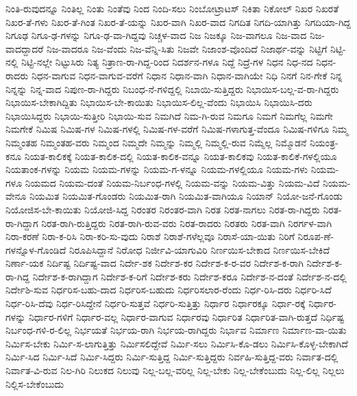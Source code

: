 {ನಿಂತಿ-ರುವುದನ್ನೂ
ನಿಂತಿಲ್ಲ
ನಿಂತು
ನಿಂತೆವು
ನಿಂದ
ನಿಂದಿ-ಸಲು
ನಿಂಬೋಟ್ರಾಟಸ್
ನಿಕಿತಾ
ನಿಕೋಲ್
ನಿಖರ
ನಿಖರತೆ
ನಿಖರ-ತೆ-ಗಳು
ನಿಖರ-ತೆ-ಗಿಂತ
ನಿಖರ-ತೆ-ಯನ್ನು
ನಿಖರ-ವಾಗಿ
ನಿಖರ-ವಾದ
ನಿಗದಿತ
ನಿಗದಿ-ಯಾಗಿತ್ತು
ನಿಗದಿಯಾ-ಗಿದ್ದ
ನಿಗೂಢ
ನಿಗೂ-ಢ-ಗಳನ್ನು
ನಿಗೂ-ಢ-ವಾ-ಗಿದ್ದವು
ನಿಚ್ಚಳ-ವಾದ
ನಿಜ
ನಿಜಕ್ಕೂ
ನಿಜ-ವಾಗಲೂ
ನಿಜ-ವಾದ
ನಿಜ-ವಾದದ್ದಾದರೆ
ನಿಜ-ವಾದರೂ
ನಿಜ-ವೆಂದು
ನಿಜ-ವೆನ್ನಿ-ಸಿತು
ನಿಜವೇ
ನಿಜಾಂಶ-ವೊಂದಿದೆ
ನಿಜಾರ್ಥ-ವನ್ನು
ನಿಟ್ಟಿಗೆ
ನಿಟ್ಟಿ-ನಲ್ಲಿ
ನಿಟ್ಟಿ-ನಲ್ಲೇ
ನಿಟ್ಟುಸಿರು
ನಿತ್ಯ
ನಿತ್ರಾಣ-ರಾ-ಗಿದ್ದ-ರಿಂದ
ನಿದರ್ಶನ-ಗಳೂ
ನಿದ್ದೆ
ನಿದ್ರೆ-ಗಳ
ನಿಧನ
ನಿಧ-ನದ
ನಿಧನ-ರಾದರು
ನಿಧನ-ವಾಗುವ
ನಿಧನ-ವಾಗುವ-ವರೆಗೆ
ನಿಧಾನ
ನಿಧಾನ-ವಾಗಿ
ನಿಧಾನ-ವಾಗಿಯೇ
ನಿಧಿ
ನಿನಗೆ
ನಿನ-ಗೇಕೆ
ನಿನ್ನ
ನಿನ್ನನ್ನು
ನಿನ್ನ-ವಾದ
ನಿಪುಣ-ರಾ-ಗಿದ್ದರು
ನಿಬಂಧ-ನೆ-ಗಳಿದ್ದಲ್ಲಿ
ನಿಬಾಯಿ-ಸುತ್ತಿದ್ದರು
ನಿಭಾಯಿಸ-ಬಲ್ಲ-ವ-ರಾ-ಗಿದ್ದರು
ನಿಭಾಯಿಸ-ಬೇಕಾಗಿದ್ದಿತು
ನಿಭಾಯಿಸ-ಬೇ-ಕಾಯಿತು
ನಿಭಾಯಿಸ-ಲಿಲ್ಲ-ವೆಂದು
ನಿಭಾಯಿಸಿ
ನಿಭಾಯಿಸಿ-ದರು
ನಿಭಾಯಿಸಿದ್ದರು
ನಿಭಾಯಿ-ಸುತ್ತೀರಿ
ನಿಭಾಯಿ-ಸುವ
ನಿಮಗಿದೆ
ನಿಮ-ಗಿ-ರುವ
ನಿಮಗೂ
ನಿಮಗೆ
ನಿಮಗೆಲ್ಲ
ನಿಮಗೇ
ನಿಮಗೇಕೆ
ನಿಮಿಷ
ನಿಮಿಷ-ಗಳ
ನಿಮಿಷ-ಗಳಲ್ಲಿ
ನಿಮಿಷ-ಗಳ-ವರೆಗೆ
ನಿಮಿಷ-ಗಳಾಗುತ್ತ-ವೆಂದೂ
ನಿಮಿಷ-ಗಳಿಗೂ
ನಿಮ್ಮ
ನಿಮ್ಮಂತಹ
ನಿಮ್ಮಂತಹ-ವರು
ನಿಮ್ಮಂದ
ನಿಮ್ಮದೇ
ನಿಮ್ಮನ್ನು
ನಿಮ್ಮಲ್ಲಿ
ನಿಮ್ಮಲ್ಲಿ-ರುವ
ನಿಮ್ಮೆಲ್ಲ
ನಿಮ್ಮೊಡನೆ
ನಿಯಂತ್ರ-ಕನೂ
ನಿಯತ-ಕಾಲಿಕಕ್ಕೆ
ನಿಯತ-ಕಾಲಿಕ-ದಲ್ಲಿ
ನಿಯತ-ಕಾಲಿಕ-ವನ್ನೂ
ನಿಯತ-ಕಾಲಿಕವು
ನಿಯತ-ಕಾಲಿಕೆ-ಗಳಲ್ಲಿಯೂ
ನಿಯತಾಂಕ-ಗಳನ್ನು
ನಿಯಮ
ನಿಯಮ-ಗಳನ್ನು
ನಿಯಮ-ಗ-ಳನ್ನೂ
ನಿಯಮ-ಗಳಲ್ಲಿಯೂ
ನಿಯಮ-ಗಳು
ನಿಯಮ-ಗಳೂ
ನಿಯಮದ
ನಿಯಮ-ದಂತೆ
ನಿಯಮ-ನಿರ್ಬಂಧ-ಗಳಲ್ಲಿ
ನಿಯಮ-ವನ್ನು
ನಿಯಮ-ವಿತ್ತು
ನಿಯಮ-ವಿದೆ
ನಿಯಮ-ವೇನೂ
ನಿಯಮಿತ
ನಿಯಮಿತ-ಗೊಂಡರು
ನಿಯಮಿತ-ರಾಗಿ
ನಿಯಮಿತ-ವಾಗಿಯೂ
ನಿಯಾನ್
ನಿಯೋ-ಜನೆ-ಗೊಂಡು
ನಿಯೋಜಿಸ-ಬೇ-ಕಾಯಿತು
ನಿಯೋಜಿ-ಸಿದ್ದ
ನಿರಂತರ
ನಿರಂತರ-ವಾಗಿ
ನಿರತ
ನಿರತ-ನಾಗಲು
ನಿರತ-ರಾ-ಗಿದ್ದರು
ನಿರತ-ರಾ-ಗಿದ್ದಾಗ
ನಿರತ-ರಾಗಿ-ರುತ್ತಿದ್ದರು
ನಿರತ-ರಾಗಿ-ರುವ-ವರು
ನಿರತ-ರಾದರು
ನಿರತರು
ನಿರತ-ವಾಗಿ
ನಿರರ್ಗಳ-ವಾಗಿ
ನಿರಾ-ಕರಣೆ
ನಿರಾ-ಕ-ರಿಸಿ
ನಿರಾ-ಕರಿ-ಸು-ವುದು
ನಿರಾಶೆ
ನಿರಾಶೆ-ಗಳೆಲ್ಲವೂ
ನಿರಾಸೆ-ಯಾ-ಯಿತು
ನಿರಿಗೆ
ನಿರೂಪ-ಣೆ-ಗಳನ್ನೊಳ-ಗೊಂಡಿದೆ
ನಿರೂಪಿಸಿದ್ದಾನೆ
ನಿರೋಧ
ನಿರ್ಜೀವಿ-ಯಾಗುವಿರಿ
ನಿರ್ಣಯಿಸ-ಬೇಕಾದ
ನಿರ್ಣಯಿಸ-ಬೇಕಿದೆ
ನಿರ್ಣಾ-ಯಕ
ನಿರ್ದಿಷ್ಟ
ನಿರ್ದಿಷ್ಟ-ವಾದ
ನಿರ್ದೇ-ಶಕ
ನಿರ್ದೇಶ-ಕರ
ನಿರ್ದೇಶ-ಕ-ರ-ವರ
ನಿರ್ದೇಶ-ಕ-ರಾಗಿ
ನಿರ್ದೇಶ-ಕ-ರಾ-ಗಿದ್ದ
ನಿರ್ದೇಶ-ಕ-ರಾಗಿದ್ದಾಗ
ನಿರ್ದೇಶ-ಕ-ರಿಗೆ
ನಿರ್ದೇಶ-ಕರು
ನಿರ್ದೇಶ-ಕರೂ
ನಿರ್ದೇಶ-ನ-ದಂತೆ
ನಿರ್ದೇಶ-ನ-ದಲ್ಲಿ
ನಿರ್ದೇಶಿ-ಸುವ
ನಿರ್ಧರಿಸ-ಬಹು-ದಾದ
ನಿರ್ಧರಿಸ-ಬಹುದು
ನಿರ್ಧರಿಸಲಾರ-ರೆಂದು
ನಿರ್ಧ-ರಿಸಿ-ದರು
ನಿರ್ಧರಿ-ಸಿದೆ
ನಿರ್ಧ-ರಿಸಿ-ದೆವು
ನಿರ್ಧ-ರಿಸಿದ್ದೇನೆ
ನಿರ್ಧರಿ-ಸುತ್ತವೆ
ನಿರ್ಧರಿ-ಸುತ್ತಿತ್ತು
ನಿರ್ಧಾರ
ನಿರ್ಧಾರಕ್ಕೂ
ನಿರ್ಧಾ-ರಕ್ಕೆ
ನಿರ್ಧಾರ-ಗಳನ್ನು
ನಿರ್ಧಾರ-ಗಳಿಗೆ
ನಿರ್ಧಾರ-ವಲ್ಲ
ನಿರ್ಧಾರ-ವಾಗುವ
ನಿರ್ಧಾರವು
ನಿರ್ಧಾರಿತ
ನಿರ್ಧಾರಿತ-ವಾಗಿ-ರುತ್ತದೆ
ನಿರ್ಧಿಷ್ಟ
ನಿರ್ಬಂಧ-ಗಳಿ-ರ-ಲಿಲ್ಲ
ನಿರ್ಭಯತೆ
ನಿರ್ಭಯ-ರಾಗಿ
ನಿರ್ಭಯ-ರಾಗಿದ್ದರು
ನಿರ್ಭಾವ
ನಿರ್ಮಾಣ
ನಿರ್ಮಾಣ-ವಾ-ಯಿತು
ನಿರ್ಮಿಸ-ಬೇಕು
ನಿರ್ಮಿ-ಸ-ಲಾಗುತ್ತಿತ್ತು
ನಿರ್ಮಿಸಲಿದ್ದೇವೆ
ನಿರ್ಮಿ-ಸಲು
ನಿರ್ಮಿಸಿ-ಕೊ-ಡಲು
ನಿರ್ಮಿಸಿ-ಕೊಳ್ಳ-ಬೇಕಾಗಿದೆ
ನಿರ್ಮಿ-ಸಿದ
ನಿರ್ಮಿ-ಸಿದೆ
ನಿರ್ಮಿ-ಸಿದ್ದರು
ನಿರ್ಮಿ-ಸುತ್ತಿದ್ದ
ನಿರ್ಮಿ-ಸುತ್ತಿದ್ದರು
ನಿರ್ವಹಿ-ಸುತ್ತಿದ್ದ-ವರು
ನಿರ್ವಾತ-ದಲ್ಲಿ
ನಿರ್ವಾತ-ವಿ-ರುವ
ನಿಲ-ಗಿರಿ
ನಿಲುಕದ
ನಿಲುವು
ನಿಲ್ಲ-ಬಲ್ಲ-ವರಿಲ್ಲ
ನಿಲ್ಲ-ಬೇಕು
ನಿಲ್ಲ-ಬೇಕೆಂಬುದು
ನಿಲ್ಲ-ಲಿಲ್ಲ
ನಿಲ್ಲಲು
ನಿಲ್ಲಿಸ-ಬೇಕೆಂಬುದು
}
